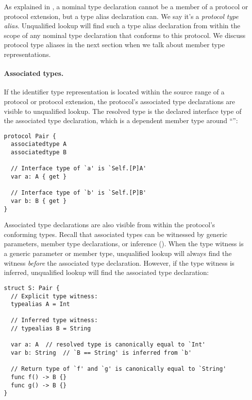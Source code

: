 \documentclass[../generics]{subfiles}
\begin{document}
As explained in , a nominal type declaration cannot be a member of a protocol or protocol extension, but a type alias declaration can. We say it's a \emph{protocol type alias}. Unqualified lookup will find such a type alias declaration from within the scope of any nominal type declaration that conforms to this protocol. We discuss protocol type aliases in the next section when we talk about member type representations.

\paragraph{Associated types.}
If the identifier type representation is located within the source range of a protocol or protocol extension, the protocol's associated type declarations are visible to unqualified lookup. The resolved type is the declared interface type of the associated type declaration, which is a dependent member type around ``\tSelf'':
\begin{Verbatim}
protocol Pair {
  associatedtype A
  associatedtype B

  // Interface type of `a' is `Self.[P]A'
  var a: A { get }

  // Interface type of `b' is `Self.[P]B'
  var b: B { get }
}
\end{Verbatim}

Associated type declarations are also visible from within the protocol's conforming types. Recall that associated types can be witnessed by generic parameters, member type declarations, or inference (). When the type witness is a generic parameter or member type, unqualified lookup will always find the witness \emph{before} the associated type declaration. However, if the type witness is inferred, unqualified lookup will find the associated type declaration:
\begin{Verbatim}
struct S: Pair {
  // Explicit type witness:
  typealias A = Int

  // Inferred type witness:
  // typealias B = String

  var a: A  // resolved type is canonically equal to `Int'
  var b: String  // `B == String' is inferred from `b'

  // Return type of `f' and `g' is canonically equal to `String'
  func f() -> B {}
  func g() -> B {}
}
\end{Verbatim}
\end{document}
